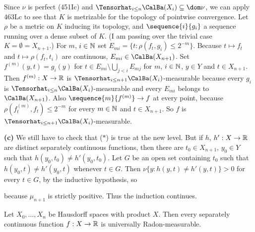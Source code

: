 {Since $\nu$ is perfect (451Ic) and 
$\Tensorhat_{i\le n}\CalBa(X_i)\subseteq\dom\nu$,
we can apply 463Lc to see that $K$ is metrizable for the
topology of pointwise convergence.   Let $\rho$ be a metric on $K$
inducing its
topology, and $\sequence{i}{g_i}$ a sequence running over a dense subset
of $K$.   (I am passing over the trivial case $K=\emptyset=X_{n+1}$.)
For $m$, $i\in\Bbb N$ set $E_{mi}=\{t:\rho(f_t,g_i)\le 2^{-m}\}$.
Because $t\mapsto f_t$ and $t\mapsto\rho(f_t,t_i)$ are continuous,
$E_{mi}\in\CalBa(X_{n+1})$.   Set
$f^{(m)}(y,t)=g_i(y)$ for $t\in E_{mi}\setminus\bigcup_{j<i}E_{mj}$
for $m$, $i\in\Bbb N$, $y\in Y$ and $t\in X_{n+1}$.   
Then $f^{(m)}:X\to\Bbb R$ is
$\Tensorhat_{i\le n+1}\CalBa(X_i)$-measurable because every $g_i$ is
$\Tensorhat_{i\le n}\CalBa(X_i)$-measurable and
every $E_{mi}$ belongs to $\CalBa(X_{n+1})$.
Also $\sequence{m}{f^{(m)}}\to f$ at every point, because
$\rho(f^{(m)}_t,f_t)\le 2^{-m}$ for every $m\in\Bbb N$ and
$t\in X_{n+1}$.   So $f$ is $\Tensorhat_{i\le n+1}\CalBa(X_i)$-measurable.

\medskip

{\bf (c)} We still have to check that ($*$) is true at the new level.
But if $h$, $h':X\to\Bbb R$ are distinct separately continuous
functions, then there are $t_0\in X_{n+1}$, $y_0\in Y$ such that
$h(y_0,t_0)\ne h'(y_0,t_0)$.   Let $G$ be an open set containing $t_0$
such that $h(y_0,t)\ne h'(y_0,t)$ whenever $t\in G$.   Then
$\nu\{y:h(y,t)\ne h'(y,t)\}>0$ for every $t\in G$, by the inductive
hypothesis, so


\noindent because $\mu_{n+1}$ is strictly positive.   Thus the induction
continues.
}%

 Let $X_0,\ldots,X_n$ be Hausdorff spaces with
product $X$.   Then every separately continuous function
$f:X\to\Bbb R$ is universally Radon-measurable.

